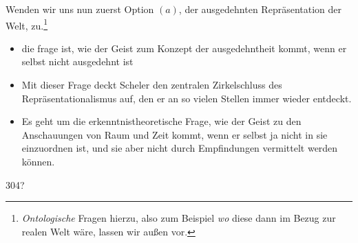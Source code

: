 \documentclass[a4paper, 12pt]{article}
\begin{document}
\begin{onehalfspace}

\noindent Wenden wir uns nun zuerst Option $(a)$, der ausgedehnten Repräsentation der Welt, zu.\footnote{\emph{Ontologische} Fragen hierzu, also zum Beispiel \emph{wo} diese dann im Bezug zur realen Welt wäre, lassen wir außen vor.} 

\begin{itemize}
  \item die frage ist, wie der Geist zum Konzept der ausgedehntheit kommt, wenn er selbst nicht ausgedehnt ist
  \item Mit dieser Frage deckt Scheler den zentralen Zirkelschluss des Repräsentationalismus auf, den er an so vielen Stellen immer wieder entdeckt.
  \item Es geht um die erkenntnistheoretische Frage, wie der Geist zu den Anschauungen von Raum und Zeit kommt, wenn er selbst ja nicht in sie einzuordnen ist, und sie aber nicht durch Empfindungen vermittelt werden können.
\end{itemize}




304? 


\end{onehalfspace}
\end{document}
